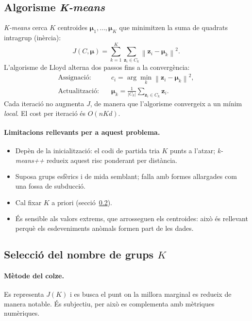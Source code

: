 \documentclass[11pt,a4paper]{article}
\newcommand{\norm}[1]{\left\lVert #1 \right\rVert}
\begin{document}
\subsection{Algorisme \textit{K-means}}
\textit{K-means} \cite{macqueen1967,lloyd1982} cerca $K$ centroides
$\boldsymbol\mu_1,\dots,\boldsymbol\mu_K$ que minimitzen la suma de quadrats
intragrup (inèrcia):
\begin{equation}
  J(C,\boldsymbol\mu)=\sum_{k=1}^{K}\sum_{\mathbf{z}_i\in C_k}\norm{\mathbf{z}_i-\boldsymbol\mu_k}^2 .
\end{equation}
L'algorisme de Lloyd alterna dos passos fins a la convergència:
\begin{align}
  \text{Assignació:}\quad & c_i=\arg\min_{k}\norm{\mathbf{z}_i-\boldsymbol\mu_k}^2,\\
  \text{Actualització:}\quad & \boldsymbol\mu_k=\frac{1}{|C_k|}\sum_{\mathbf{z}_i\in C_k}\mathbf{z}_i .
\end{align}
Cada iteració no augmenta $J$, de manera que l'algorisme convergeix a un
mínim \emph{local}. El cost per iteració és $O(nKd)$.

\paragraph{Limitacions rellevants per a aquest problema.}
\begin{itemize}[nosep]
  \item Depèn de la inicialització: el codi de partida tria $K$ punts a
        l'atzar; \textit{k-means++} \cite{arthur2007} redueix aquest risc
        ponderant per distància.
  \item Suposa grups esfèrics i de mida semblant; falla amb formes allargades
        com una fossa de subducció.
  \item Cal fixar $K$ a priori (secció~\ref{sec:triaK}).
  \item És sensible als valors extrems, que arrosseguen els centroides: això
        és rellevant perquè els esdeveniments anòmals formen part de les dades.
\end{itemize}

\subsection{Selecció del nombre de grups $K$}\label{sec:triaK}
\paragraph{Mètode del colze.} Es representa $J(K)$ i es busca el punt on la
millora marginal es redueix de manera notable. És subjectiu, per això es
complementa amb mètriques numèriques.
\end{document}
